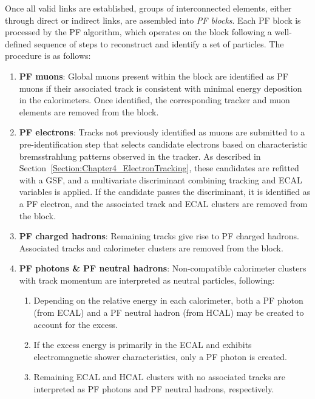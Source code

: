 Once all valid links are established, groups of interconnected elements, either through direct or indirect links, are assembled into \textit{\ac{PF} blocks}. Each \ac{PF} block is processed by the \ac{PF} algorithm, which operates on the block following a well-defined sequence of steps to reconstruct and identify a set of particles. The procedure is as follows:

\begin{enumerate}
    \item \textbf{\ac{PF} muons}: Global muons present within the block are identified as \ac{PF} muons if their associated track is consistent with minimal energy deposition in the calorimeters. Once identified, the corresponding tracker and muon elements are removed from the block.
    \item \textbf{\ac{PF} electrons}: Tracks not previously identified as muons are submitted to a pre-identification step that selects candidate electrons based on characteristic bremsstrahlung patterns observed in the tracker. As described in Section~\ref{Section:Chapter4_ElectronTracking}, these candidates are refitted with a \ac{GSF}, and a multivariate discriminant combining tracking and \ac{ECAL} variables is applied. If the candidate passes the discriminant, it is identified as a \ac{PF} electron, and the associated track and \ac{ECAL} clusters are removed from the block.
    \item \textbf{\ac{PF} charged hadrons}: Remaining tracks give rise to \ac{PF} charged hadrons. Associated tracks and calorimeter clusters are removed from the block.
    \item \textbf{\ac{PF} photons \& \ac{PF} neutral hadrons}: Non-compatible calorimeter clusters with track momentum are interpreted as neutral particles, following:
    \begin{enumerate}
        \item Depending on the relative energy in each calorimeter, both a \ac{PF} photon (from \ac{ECAL}) and a \ac{PF} neutral hadron (from \ac{HCAL}) may be created to account for the excess.
        \item If the excess energy is primarily in the \ac{ECAL} and exhibits electromagnetic shower characteristics, only a \ac{PF} photon is created.
        \item Remaining \ac{ECAL} and \ac{HCAL} clusters with no associated tracks are interpreted as \ac{PF} photons and \ac{PF} neutral hadrons, respectively.
    \end{enumerate}
\end{enumerate}

